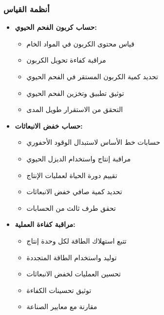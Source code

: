 \subsubsection{أنظمة القياس}
\begin{itemize}
    \item \textbf{حساب كربون الفحم الحيوي:}
    \begin{itemize}
        \item قياس محتوى الكربون في المواد الخام
        \item مراقبة كفاءة تحويل الكربون
        \item تحديد كمية الكربون المستقر في الفحم الحيوي
        \item توثيق تطبيق وتخزين الفحم الحيوي
        \item التحقق من الاستقرار طويل المدى
    \end{itemize}
    
    \item \textbf{حساب خفض الانبعاثات:}
    \begin{itemize}
        \item حسابات خط الأساس لاستبدال الوقود الأحفوري
        \item مراقبة إنتاج واستخدام الديزل الحيوي
        \item تقييم دورة الحياة لعمليات الإنتاج
        \item تحديد كمية صافي خفض الانبعاثات
        \item تحقق طرف ثالث من الحسابات
    \end{itemize}
    
    \item \textbf{مراقبة كفاءة العملية:}
    \begin{itemize}
        \item تتبع استهلاك الطاقة لكل وحدة إنتاج
        \item توليد واستخدام الطاقة المتجددة
        \item تحسين العمليات لخفض الانبعاثات
        \item توثيق تحسينات الكفاءة
        \item مقارنة مع معايير الصناعة
    \end{itemize}
\end{itemize}

